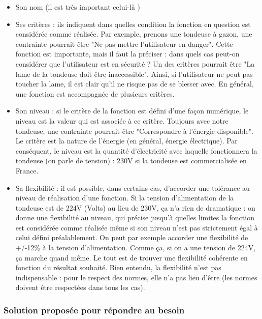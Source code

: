 \begin{itemize}
  \item Son nom (il est très important celui-là )\\
  \item Ses critères : ils indiquent dans quelles condition la fonction en question est considérée comme réalisée.
    Par exemple, prenons une tondeuse à gazon, une contrainte pourrait être "Ne pas mettre l'utilisateur en danger". 
    Cette fonction est importante, mais il faut la préciser : dans quels cas peut-on considérer que l'utilisateur est en sécurité ? 
    Un des critères pourrait être "La lame de la tondeuse doit être inaccessible". Ainsi, si l'utilisateur ne peut pas toucher la lame, il est clair qu'il ne risque pas de se blesser avec. 
    En général, une fonction est accompagnée de plusieurs critères.\\
  \item Son niveau : si le critère de la fonction est défini d'une façon numérique, le niveau est la valeur qui est associée à ce critère. 
    Toujours avec notre tondeuse, une contrainte pourrait être "Correspondre à l'énergie disponible". 
    Le critère est la nature de l'énergie (en général, énergie électrique). 
    Par conséquent, le niveau est la quantité d'électricité avec laquelle fonctionnera la tondeuse (on parle de tension) : 230V si la tondeuse est commercialisée en France.\\
  \item Sa flexibilité : il est possible, dans certains cas, d'accorder une tolérance au niveau de réalisation d'une fonction. 
    Si la tension d'alimentation de la tondeuse est de 224V (Volts) au lieu de 230V, ça n'a rien de dramatique : on donne une flexibilité au niveau, 
    qui précise jusqu'à quelles limites la fonction est considérée comme réalisée même si son niveau n'est pas strictement égal à celui défini préalablement. 
    On peut par exemple accorder une flexibilité de +/-12\% à la tension d'alimentation. Comme ça, si on a une tension de 224V, ça marche quand même. 
    Le tout est de trouver une flexibilité cohérente en fonction du résultat souhaité. Bien entendu, la flexibilité n'est pas indispensable : pour le respect des normes, elle n'a pas lieu d'être (les normes doivent être respectées dans tous les cas).\\
\end{itemize}

\subsubsection{Solution proposée pour répondre au besoin}

